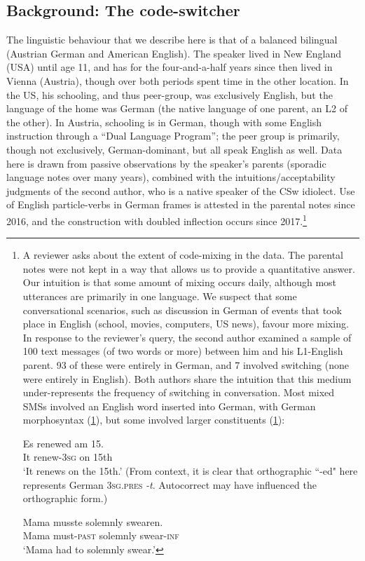 \documentclass[output=paper]{langscibook}
\begin{document}
\subsection{Background: The code-switcher}

The linguistic behaviour that we describe here is that of a balanced bilingual (Austrian German and American English). The speaker lived in New England (USA) until age 11, and has for the four-and-a-half years since then lived in Vienna (Austria), though over both periods spent time in the other location. In the US, his schooling, and thus peer-group, was exclusively English, but the language of the home was German (the native language of one parent, an  L2 of the other). In Austria, schooling is in German, though with some English instruction through a ``Dual Language Program''; the peer group is primarily, though not exclusively, German-dominant, but all speak English as well. Data here is drawn from passive observations by the speaker's parents (sporadic language notes over many years), combined with the intuitions/acceptability judgments of the second author, who is a native speaker of the CSw idiolect. Use of English particle-verbs in German frames is attested in the parental notes since 2016, and the construction with doubled inflection occurs since 2017.\footnote{A reviewer asks about the extent of code-mixing in the data. The parental notes were not kept in a way that allows us to provide a quantitative answer. Our intuition is that some amount of mixing occurs daily, although most utterances are primarily in one language. We suspect that some conversational scenarios, such as discussion in German of events that took place in English (school, movies, computers, US news), favour more mixing. In response to the reviewer's query, the second author examined a sample of 100 text messages (of two words or more) between him and his L1-English parent. 93 of these were entirely in German, and 7 involved switching (none were entirely in English). Both authors share the intuition that this medium under-represents the frequency of switching in conversation. Most mixed SMSs involved an English word inserted into German, with German morphosyntax (\ref{renewed}), but some involved larger constituents (\ref{solemnly}): 

\ea\gll \label{renewed}Es renewed am 15.\\
It renew-{\textsc{3sg}} on 15th\\
\glt `It renews on the 15th.' (From context, it is clear that orthographic ``-ed" here represents German \textsc{3sg.pres} \textit{-t}. Autocorrect may have influenced the orthographic form.)
\z 

\ea\gll \label{solemnly}Mama musste solemnly swearen.\\
Mama must-{\textsc{past}} solemnly swear-\textsc{inf}\\
\glt `Mama had to solemnly swear.'
\z 
} 
\end{document}
